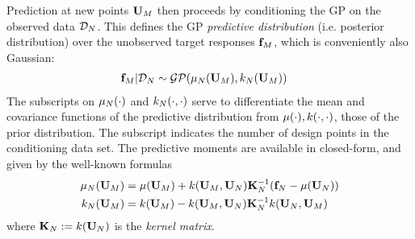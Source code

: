 \documentclass[12pt]{article}
\begin{document}
Prediction at new points $\designMat[M]$ then proceeds by conditioning the GP on the observed data $\designData_{\Ndesign}$. This defines the 
GP \textit{predictive distribution} (i.e. posterior distribution) over the unobserved target responses $\fObs[M]$, which is conveniently also Gaussian:
\begin{align}
\fObs[M] | \designData_{\Ndesign} &\sim \GP(\GPMeanPred[\Ndesign](\designMat[M]), \GPKerPred[\Ndesign](\designMat[M]))
\end{align}
The subscripts on $\GPMeanPred[\Ndesign](\cdot)$ and $\GPKerPred[\Ndesign](\cdot, \cdot)$ serve to differentiate the mean and covariance functions of the predictive 
distribution from $\GPMean(\cdot), \GPKer(\cdot, \cdot)$, those of the prior distribution. The subscript indicates the number of design points in the conditioning data set. 
The predictive moments are available in closed-form, and given by the well-known formulas 
\begin{align}
\GPMeanPred[\Ndesign](\designMat[M]) &= \GPMean(\designMat[M]) + \GPKer(\designMat[M], \designMat[\Ndesign]) \KerMat[\Ndesign]^{-1}(\fObs[\Ndesign] - \GPMean(\designMat[\Ndesign])) \label{kriging_eqns} \\
\GPKerPred[\Ndesign](\designMat[M]) &= \GPKer(\designMat[M]) - \GPKer(\designMat[M], \designMat[\Ndesign]) \KerMat[\Ndesign]^{-1} \GPKer(\designMat[\Ndesign], \designMat[M]) 
\end{align}
where $\KerMat[\Ndesign] := \GPKer(\designMat[\Ndesign])$ is the \textit{kernel matrix}.
\end{document}
